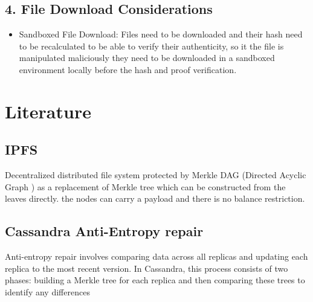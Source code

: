 \documentclass[journal]{IEEEtran}
\begin{document}
\subsection*{4. File Download Considerations}
\begin{itemize}
  \item Sandboxed File Download: Files need to be downloaded and their hash need to be recalculated to be able to verify their authenticity, so it the file is manipulated maliciously they need to be downloaded in a sandboxed environment locally before the hash and proof verification.
\end{itemize}


\section{Literature}
\subsection*{IPFS}
Decentralized distributed file system protected by Merkle DAG (Directed Acyclic Graph ) as a replacement of Merkle tree which can be constructed from the leaves directly. the nodes can carry a payload and there is no balance restriction.
\subsection*{Cassandra Anti-Entropy repair}
Anti-entropy repair involves comparing data across all replicas and updating each replica to the most recent version. In Cassandra, this process consists of two phases: building a Merkle tree for each replica and then comparing these trees to identify any differences


\ifCLASSOPTIONcaptionsoff
  \newpage
\fi




\end{document}
